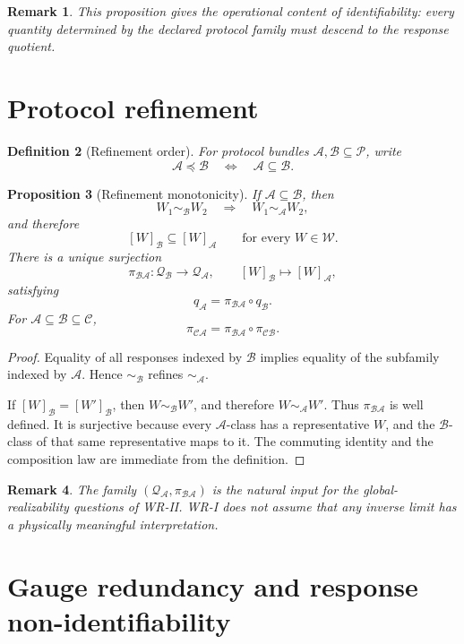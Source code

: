 \documentclass[11pt]{article}
\newtheorem{definition}{Definition}[section]
\newtheorem{proposition}[definition]{Proposition}
\newtheorem{remark}[definition]{Remark}
\newcommand{\W}{\mathcal W}
\newcommand{\Pcal}{\mathcal P}
\newcommand{\Acal}{\mathcal A}
\newcommand{\Bcal}{\mathcal B}
\begin{document}
\begin{remark}
This proposition gives the operational content of identifiability: every
quantity determined by the declared protocol family must descend to the
response quotient.
\end{remark}

\section{Protocol refinement}

\begin{definition}[Refinement order]
For protocol bundles $\Acal,\Bcal\subseteq\Pcal$, write
\[
\Acal\preceq\Bcal
\quad\Longleftrightarrow\quad
\Acal\subseteq\Bcal.
\]
\end{definition}

\begin{proposition}[Refinement monotonicity]
If $\Acal\subseteq\Bcal$, then
\[
W_1\sim_{\Bcal}W_2
\quad\Longrightarrow\quad
W_1\sim_{\Acal}W_2,
\]
and therefore
\[
[W]_{\Bcal}\subseteq[W]_{\Acal}
\qquad
\text{for every }W\in\W.
\]
There is a unique surjection
\[
\pi_{\Bcal\Acal}:\mathcal Q_{\Bcal}\to\mathcal Q_{\Acal},
\qquad
[W]_{\Bcal}\mapsto[W]_{\Acal},
\]
satisfying
\[
q_{\Acal}
=
\pi_{\Bcal\Acal}\circ q_{\Bcal}.
\]
For $\Acal\subseteq\Bcal\subseteq\mathcal C$,
\[
\pi_{\mathcal C\Acal}
=
\pi_{\Bcal\Acal}\circ\pi_{\mathcal C\Bcal}.
\]
\end{proposition}

\begin{proof}
Equality of all responses indexed by $\Bcal$ implies equality of the subfamily
indexed by $\Acal$.  Hence $\sim_{\Bcal}$ refines $\sim_{\Acal}$.

If $[W]_{\Bcal}=[W']_{\Bcal}$, then $W\sim_{\Bcal}W'$, and therefore
$W\sim_{\Acal}W'$.  Thus $\pi_{\Bcal\Acal}$ is well defined.  It is surjective
because every $\Acal$-class has a representative $W$, and the $\Bcal$-class of
that same representative maps to it.  The commuting identity and the
composition law are immediate from the definition.
\end{proof}

\begin{remark}
The family $(\mathcal Q_{\Acal},\pi_{\Bcal\Acal})$ is the natural input for the
global-realizability questions of WR-II.  WR-I does not assume that any inverse
limit has a physically meaningful interpretation.
\end{remark}

\section{Gauge redundancy and response non-identifiability}
\end{document}
